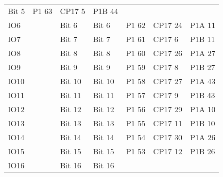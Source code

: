 \begin{table}[H]
\begin{adjustbox}{width=1\textwidth}
\begin{tabular}{|lllllll|}
  \multicolumn{1}{l|}{Bit 5} &
  \multicolumn{1}{l|}{P1 63} &
  \multicolumn{1}{l|}{CP17 5} &
  P1B 44 \\
\multicolumn{1}{|l|}{IO6} &
  \multicolumn{1}{l|}{} &
  \multicolumn{1}{l|}{Bit 6} &
  \multicolumn{1}{l|}{Bit 6} &
  \multicolumn{1}{l|}{P1 62} &
  \multicolumn{1}{l|}{CP17 24} &
  P1A 11 \\
\multicolumn{1}{|l|}{IO7} &
  \multicolumn{1}{l|}{} &
  \multicolumn{1}{l|}{Bit 7} &
  \multicolumn{1}{l|}{Bit 7} &
  \multicolumn{1}{l|}{P1 61} &
  \multicolumn{1}{l|}{CP17 6} &
  P1B 11 \\
\multicolumn{1}{|l|}{IO8} &
  \multicolumn{1}{l|}{} &
  \multicolumn{1}{l|}{Bit 8} &
  \multicolumn{1}{l|}{Bit 8} &
  \multicolumn{1}{l|}{P1 60} &
  \multicolumn{1}{l|}{CP17 26} &
  P1A 27 \\
\multicolumn{1}{|l|}{IO9} &
  \multicolumn{1}{l|}{} &
  \multicolumn{1}{l|}{Bit 9} &
  \multicolumn{1}{l|}{Bit 9} &
  \multicolumn{1}{l|}{P1 59} &
  \multicolumn{1}{l|}{CP17 8} &
  P1B 27 \\
\multicolumn{1}{|l|}{IO10} &
  \multicolumn{1}{l|}{} &
  \multicolumn{1}{l|}{Bit 10} &
  \multicolumn{1}{l|}{Bit 10} &
  \multicolumn{1}{l|}{P1 58} &
  \multicolumn{1}{l|}{CP17 27} &
  P1A 43 \\
\multicolumn{1}{|l|}{IO11} &
  \multicolumn{1}{l|}{} &
  \multicolumn{1}{l|}{Bit 11} &
  \multicolumn{1}{l|}{Bit 11} &
  \multicolumn{1}{l|}{P1 57} &
  \multicolumn{1}{l|}{CP17 9} &
  P1B 43 \\
\multicolumn{1}{|l|}{IO12} &
  \multicolumn{1}{l|}{} &
  \multicolumn{1}{l|}{Bit 12} &
  \multicolumn{1}{l|}{Bit 12} &
  \multicolumn{1}{l|}{P1 56} &
  \multicolumn{1}{l|}{CP17 29} &
  P1A 10 \\
\multicolumn{1}{|l|}{IO13} &
  \multicolumn{1}{l|}{} &
  \multicolumn{1}{l|}{Bit 13} &
  \multicolumn{1}{l|}{Bit 13} &
  \multicolumn{1}{l|}{P1 55} &
  \multicolumn{1}{l|}{CP17 11} &
  P1B 10 \\
\multicolumn{1}{|l|}{IO14} &
  \multicolumn{1}{l|}{} &
  \multicolumn{1}{l|}{Bit 14} &
  \multicolumn{1}{l|}{Bit 14} &
  \multicolumn{1}{l|}{P1 54} &
  \multicolumn{1}{l|}{CP17 30} &
  P1A 26 \\
\multicolumn{1}{|l|}{IO15} &
  \multicolumn{1}{l|}{} &
  \multicolumn{1}{l|}{Bit 15} &
  \multicolumn{1}{l|}{Bit 15} &
  \multicolumn{1}{l|}{P1 53} &
  \multicolumn{1}{l|}{CP17 12} &
  P1B 26 \\
\multicolumn{1}{|l|}{IO16} &
  \multicolumn{1}{l|}{} &
  \multicolumn{1}{l|}{Bit 16} &
  \multicolumn{1}{l|}{Bit 16} &

\end{tabular}
\end{adjustbox}
\end{table}
